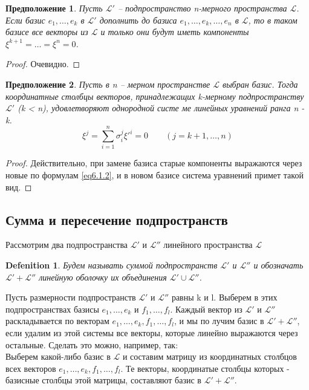 \documentclass[11pt; a4paper]{report}
\theoremstyle{plain} %
\newtheorem{sug}{Предположение}[section]
\theoremstyle{defenition}
\newtheorem{glob_def}{Defenition}
\theoremstyle{remark}
\begin{document}
\begin{sug}\label{sug6.2.3}
Пусть $\mathscr{L'}$ -- подпространство n-мерного пространства $\mathscr{L}$.
 Если базис $e_1, \ldots , e_k$ в $\mathscr{L'}$ дополнить до ба­зиса $e_1, \ldots , e_k, \ldots , e_n$ в $\mathscr{L}$, то в таком базисе все векторы из  $\mathscr{L}$ и только они будут иметь компоненты $\xi^{k+1} = \ldots = \xi^n = 0$.
\end{sug}
\begin{proof} Очевидно. \end{proof}

\begin{sug}\label{sug6.2.4}
Пусть в n -- мерном пространстве $\mathscr{L}$ выбран базис. Тогда координатные 
столбцы векторов, принадлежащих k-мер­ному подпространству $\mathscr{L'}$ (k < n),
удовлетворяют однородной систе­ ме линейных уравнений ранга n - k.
    \begin{equation*}
    \xi^{j} = \sum_{i=1}^n \sigma_i^{j}\xi'^i = 0 \qquad (j = k+1, \ldots, n)
    \end{equation*}
\end{sug}
\begin{proof} Действительно, при замене базиса старые компоненты выражаются
через новые по формулам \ref{eq6.1.2}, и в новом базисе система уравнений примет такой вид.
\end{proof}





\subsection{Сумма и пересечение подпространств}
Рассмотрим два подпространства $\mathscr{L'}$ и $\mathscr{L''}$ линейного пространства $\mathscr{L}$
\begin{glob_def}
Будем называть суммой подпространств $\mathscr{L'}$ и $\mathscr{L''}$ и обозначать
 $\mathscr{L'}+\mathscr{L''}$ линейную оболочку их объединения $\mathscr{L'} \cup \mathscr{L''}$.
\end{glob_def}
Пусть размерности подпространств $\mathscr{L'}$ и $\mathscr{L''}$ равны k и l.
 Выберем в этих подпространствах базисы $e_1, \ldots, e_k$ и $f_1, \ldots, f_l$. 
 Каждый вектор из $\mathscr{L'}$ и $\mathscr{L''}$ раскладывается по векторам 
 $e_1, \ldots, e_k, f_1, \ldots, f_l$, и мы по­ лучим базис в $\mathscr{L'}+\mathscr{L''}$, 
 если удалим из этой системы все векторы, которые линейно выражаются через остальные.
 Сделать это можно, например, так:\\
 Выберем какой-либо базис в $\mathscr{L}$ и составим матрицу из координат­ных столбцов всех векторов 
$e_1, \ldots, e_k, f_1, \ldots, f_l$. Те векторы, координат­ые столбцы которых - базисные столбцы этой матрицы, 
составляют базис в  $\mathscr{L'}+\mathscr{L''}$.
\end{document}
